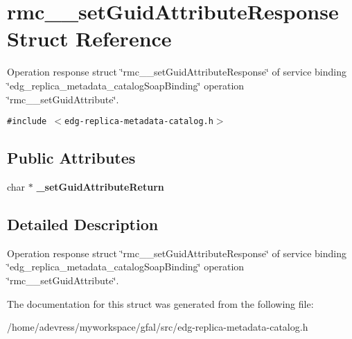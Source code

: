 \section{rmc\_\-\_\-set\-Guid\-Attribute\-Response Struct Reference}
\label{structrmc____setGuidAttributeResponse}
Operation response struct \char`\"{}rmc\_\-\_\-set\-Guid\-Attribute\-Response\char`\"{} of service binding \char`\"{}edg\_\-replica\_\-metadata\_\-catalog\-Soap\-Binding\char`\"{} operation \char`\"{}rmc\_\-\_\-set\-Guid\-Attribute\char`\"{}.  


{\tt \#include $<$edg-replica-metadata-catalog.h$>$}

\subsection*{Public Attributes}
\begin{CompactItemize}
\item 
char $\ast$ \textbf{\_\-set\-Guid\-Attribute\-Return}\label{structrmc____setGuidAttributeResponse_9487907589554c0e04d5dee876ee78b8}

\end{CompactItemize}


\subsection{Detailed Description}
Operation response struct \char`\"{}rmc\_\-\_\-set\-Guid\-Attribute\-Response\char`\"{} of service binding \char`\"{}edg\_\-replica\_\-metadata\_\-catalog\-Soap\-Binding\char`\"{} operation \char`\"{}rmc\_\-\_\-set\-Guid\-Attribute\char`\"{}. 



The documentation for this struct was generated from the following file:\begin{CompactItemize}
\item 
/home/adevress/myworkspace/gfal/src/edg-replica-metadata-catalog.h\end{CompactItemize}
